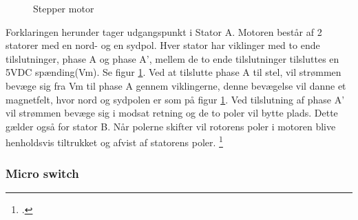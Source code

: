 \begin{figure}[H] \centering
    \caption{Stepper motor}
    \label{fig:HWD_Bipolar_Stepper_Motor}
\end{figure}

Forklaringen herunder tager udgangspunkt i Stator A.
\newline Motoren består af 2 statorer med en nord- og en sydpol. Hver stator har viklinger med to ende tilslutninger, phase A og phase A’, mellem de to ende tilslutninger tilsluttes en 5VDC spænding(Vm). Se figur \ref{fig:HWD_Bipolar_Stepper_Motor}.
Ved at tilslutte phase A til stel, vil strømmen bevæge sig fra Vm til phase A gennem viklingerne, denne bevægelse vil danne et magnetfelt, hvor nord og sydpolen er som på figur \ref{fig:HWD_Bipolar_Stepper_Motor}. Ved tilslutning af phase A’ vil strømmen bevæge sig i modsat retning og de to poler vil bytte plads. Dette gælder også for stator B. Når polerne skifter vil rotorens poler i motoren blive henholdsvis tiltrukket og afvist af statorens poler. \footcite{gfv}

\subsubsection{Micro switch}

